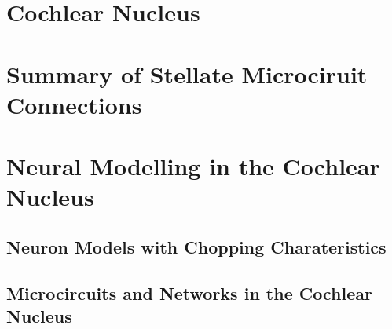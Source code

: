 \documentclass[10pt,a4paper,twoside,openright]{book}
\begin{document}
\section{Cochlear Nucleus}\label{Ch1:CochelarNucleus}

\newpage
\begin{landscape}
{\small{}}  
\end{landscape}

%
%
%
%

\section{Summary of Stellate Microciruit Connections}



\section{Neural Modelling in the Cochlear Nucleus}

\subsection{Neuron Models with Chopping Charateristics}

\subsection{Microcircuits and Networks in the Cochlear Nucleus}







 

\newpage
\listoftodos
\end{document}
